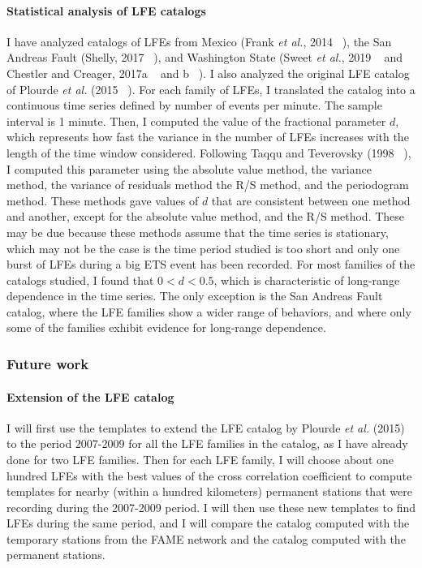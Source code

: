 \documentclass[letterpaper, 12pt]{article}
\begin{document}
\paragraph{Statistical analysis of LFE catalogs} I have analyzed catalogs of LFEs from Mexico (Frank \textit{et al.}, 2014 ~\cite{FRA_2014}), the San Andreas Fault (Shelly, 2017 ~\cite{SHE_2017}), and Washington State (Sweet \textit{et al.}, 2019 ~\cite{SWE_2019} and Chestler and Creager, 2017a ~\cite{CHE_2017_JGR} and b ~\cite{CHE_2017_G3}). I also analyzed the original LFE catalog of Plourde \textit{et al.} (2015 ~\cite{PLO_2015}). For each family of LFEs, I translated the catalog into a continuous time series defined by number of events per minute. The sample interval is 1 minute. Then, I computed the value of the fractional parameter $d$, which represents how fast the variance in the number of LFEs increases with the length of the time window considered. Following Taqqu and Teverovsky (1998 ~\cite{TAQ_1998}), I computed this parameter using the absolute value method, the variance method, the variance of residuals method the R/S method, and the periodogram method. These methods gave values of $d$ that are consistent between one method and another, except for the absolute value method, and the R/S method. These may be due because these methods assume that the time series is stationary, which may not be the case is the time period studied is too short and only one burst of LFEs during a big ETS event has been recorded. For most families of the catalogs studied, I found that $0 < d < 0.5$, which is characteristic of long-range dependence in the time series. The only exception is the San Andreas Fault catalog, where the LFE families show a wider range of behaviors, and where only some of the families exhibit evidence for long-range dependence.

\subsubsection*{Future work}

\paragraph{Extension of the LFE catalog} I will first use the templates to extend the LFE catalog by Plourde \textit{et al.} (2015) to the period 2007-2009 for all the LFE families in the catalog, as I have already done for two LFE families. Then for each LFE family, I will choose about one hundred LFEs with the best values of the cross correlation coefficient to compute templates for nearby (within a hundred kilometers) permanent stations that were recording during the 2007-2009 period. I will then use these new templates to find LFEs during the same period, and I will compare the catalog computed with the temporary stations from the FAME network and the catalog computed with the permanent stations. 
\end{document}
